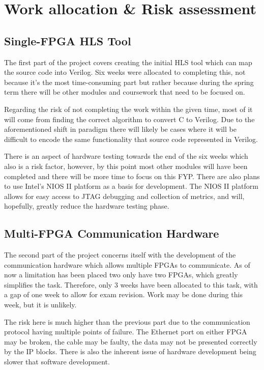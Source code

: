 \section{Work allocation \& Risk assessment}
\subsection{Single-FPGA HLS Tool}

The first part of the project covers creating the initial HLS tool which can map the source code into Verilog. Six weeks were allocated to completing this, not because it's the most time-consuming part but rather because during the spring term there will be other modules and coursework that need to be focused on.

Regarding the risk of not completing the work within the given time, most of it will come from finding the correct algorithm to convert C to Verilog. Due to the aforementioned shift in paradigm there will likely be cases where it will be difficult to encode the same functionality that source code represented in Verilog.

There is an aspect of hardware testing towards the end of the six weeks which also is a risk factor, however, by this point most other modules will have been completed and there will be more time to focus on this FYP. There are also plans to use Intel's NIOS II platform as a basis for development. The NIOS II platform allows for easy access to JTAG debugging and  collection of metrics, and will, hopefully, greatly reduce the hardware testing phase.

\subsection{Multi-FPGA Communication Hardware}

The second part of the project concerns itself with the development of the communication hardware which allows multiple FPGAs to communicate. As of now a limitation has been placed two only have two FPGAs, which greatly simplifies the task. Therefore, only 3 weeks have been allocated to this task, with a gap of one week to allow for exam revision. Work may be done during this week, but it is unlikely.

The risk here is much higher than the previous part due to the communication protocol having multiple points of failure. The Ethernet port on either FPGA may be broken, the cable may be faulty, the data may not be presented correctly by the IP blocks. There is also the inherent issue of hardware development being slower that software development. 

